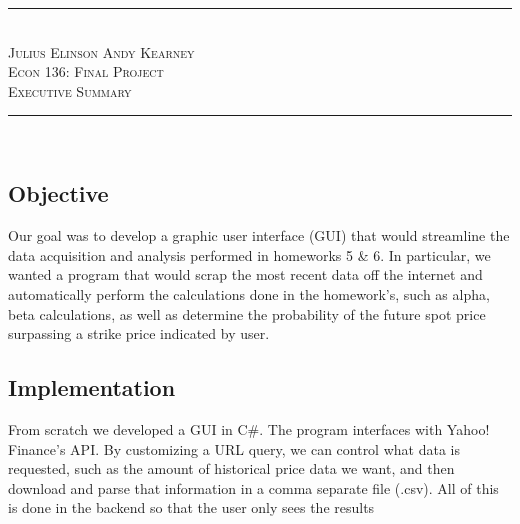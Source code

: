 \documentclass[pdftex,12pt]{article}
\theoremstyle{definition}
\theoremstyle{remark}
\begin{document}
\newcommand{\HRule}{\rule{\linewidth}{0.4mm}}
\begin{center}
\HRule \\
\textsc{Julius Elinson} \hfill \textsc{Andy Kearney}\\[.1cm]
\textsc{\Large{Econ 136: Final Project \\Executive Summary}}\\[-.1cm] %
\HRule \\[.4cm]
\end{center}
\subsection*{Objective}
Our goal was to develop a graphic user interface (GUI) that would streamline the data acquisition and analysis performed in homeworks 5 \& 6. In particular, we wanted a program that would scrap the most recent data off the internet and automatically perform the calculations done in the homework's, such as alpha, beta calculations, as well as determine the probability of the future spot price surpassing a strike price indicated by user.
\subsection*{Implementation}
From scratch we developed a GUI in C\#. The program interfaces with Yahoo! Finance's API. By customizing a URL query, we can control what data is requested, such as the amount of historical price data we want, and then download and parse that information in a comma separate file (.csv). All of this is done in the backend so that the user only sees the results
\end{document}
